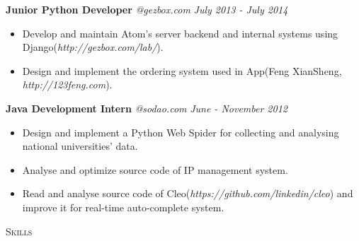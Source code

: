 ﻿\documentclass[9pt]{article}
\newenvironment{changemargin}[2]{%
  \begin{list}{}{%
    \setlength{\topsep}{0pt}%
    \setlength{\leftmargin}{#1}%
    \setlength{\rightmargin}{#2}%
    \setlength{\listparindent}{\parindent}%
    \setlength{\itemindent}{\parindent}%
    \setlength{\parsep}{\parskip}%
  }%
  \item[]}{\end{list}
}
\newcommand{\lineover}{
	\begin{changemargin}{-0.05in}{-0.05in}
		\vspace*{-8pt}
		\hrulefill \\
		\vspace*{-2pt}
	\end{changemargin}
}
\newcommand{\header}[1]{
	\begin{changemargin}{-0.5in}{-0.5in}
		\scshape{#1}\\
  	\lineover
	\end{changemargin}
}
\newenvironment{body} {
	\vspace*{-16pt}
	\begin{changemargin}{-0.25in}{-0.5in}
  }
	{\end{changemargin}
}
\begin{document}
\begin{body}
    \textbf{Junior Python Developer} \emph{@gezbox.com} \hfill \emph{July 2013 - July 2014}\\
    \vspace*{-4pt}
    \begin{itemize} \itemsep -0pt  %
        \item Develop and maintain Atom's server backend and internal systems using Django(\emph{http://gezbox.com/lab/}).
        \item Design and implement the ordering system used in App(Feng XianSheng, \emph{http://123feng.com}).
    \end{itemize}

	\textbf{Java Development Intern} \emph{@sodao.com} \hfill \emph{June - November 2012}\\
	\vspace*{-4pt}
	\begin{itemize} \itemsep -0pt  %
		\item Design and implement a Python Web Spider for collecting and analysing national universities' data.
        \item Analyse and optimize source code of IP management system.
        \item Read and analyse source code of Cleo(\emph{https://github.com/linkedin/cleo}) and improve it for real-time auto-complete system.
	\end{itemize}

\end{body}

\smallskip


\header{Skills}
\end{document}

